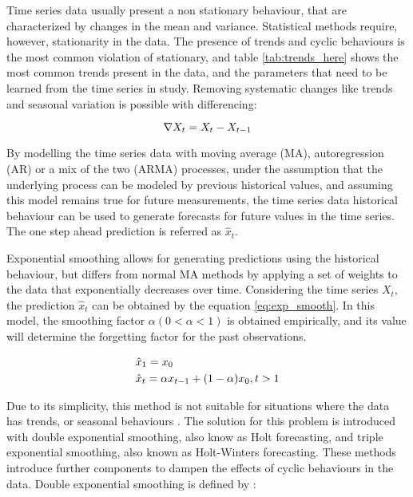 \par Time series data usually present a non stationary behaviour, that are characterized by changes in the mean and variance. Statistical methods require, however, stationarity in the data. The presence of trends and cyclic behaviours
is the most common violation of stationary, and table \ref{tab:trends_here} shows the most common trends present in the data, and the parameters that need to be learned from the time series in study. Removing systematic changes like trends
and seasonal variation is possible with differencing:

\begin {equation*}
\centering
\nabla X_t = X_t - X_{t-1}
\end {equation*}

\par By modelling the time series data with moving average (MA), autoregression (AR) or a mix of the two (ARMA) processes, under the assumption that the underlying
process can be modeled by previous historical values, and assuming this model remains true for future measurements, the time series data historical behaviour can
be used to generate forecasts for future values in the time series. The one step ahead prediction is referred as $\hat{x}_t$.

\par Exponential smoothing allows for generating predictions using the historical behaviour, but differs from normal MA methods by applying a set of weights to the
data that exponentially decreases over time. Considering the time series $X_t$, the prediction $\hat{x}_t$ can be obtained by the equation \ref{eq:exp_smooth}. 
In this model, the smoothing factor $\alpha (0 < \alpha < 1)$ is obtained empirically, and its value will determine the forgetting factor for the past observations.

\begin {equation*}
\centering
\begin {split}
&\hat{x}_1 = x_0 \\
&\hat{x}_t = \alpha x_{t-1} + (1-\alpha)x_0, t > 1
\end {split}
\label{eq:exp_smooth}
\end {equation*}

\par Due to its simplicity, this method is not suitable for situations where the data has trends, or seasonal behaviours \cite{kalekar_time_2004}. The solution for
this problem is introduced with double exponential smoothing, also know as Holt forecasting, and triple exponential smoothing, also known as Holt-Winters
forecasting. These methods introduce further components to dampen the effects of cyclic behaviours in the data. Double exponential smoothing is defined by
\cite{munz_traffic_2010} :

